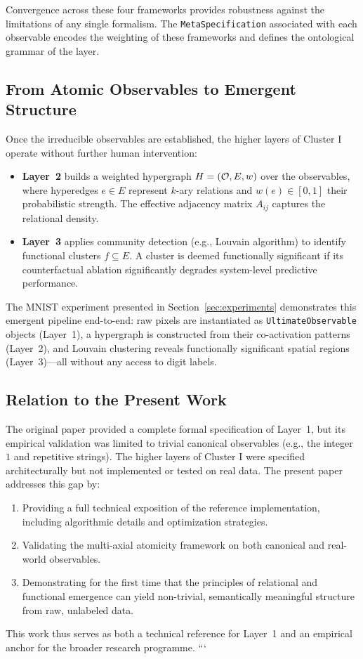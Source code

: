 Convergence across these four frameworks provides robustness against the limitations of any single formalism. The \texttt{MetaSpecification} associated with each observable encodes the weighting of these frameworks and defines the ontological grammar of the layer.

\subsection{From Atomic Observables to Emergent Structure}

Once the irreducible observables are established, the higher layers of Cluster I operate without further human intervention:

\begin{itemize}
    \item \textbf{Layer~2} builds a weighted hypergraph $H = (\mathcal{O}, E, w)$ over the observables, where hyperedges $e \in E$ represent $k$-ary relations and $w(e) \in [0,1]$ their probabilistic strength. The effective adjacency matrix $A_{ij}$ captures the relational density.
    \item \textbf{Layer~3} applies community detection (e.g., Louvain algorithm) to identify functional clusters $f \subseteq E$. A cluster is deemed functionally significant if its counterfactual ablation significantly degrades system-level predictive performance.
\end{itemize}

The MNIST experiment presented in Section~\ref{sec:experiments} demonstrates this emergent pipeline end-to-end: raw pixels are instantiated as \texttt{UltimateObservable} objects (Layer~1), a hypergraph is constructed from their co-activation patterns (Layer~2), and Louvain clustering reveals functionally significant spatial regions (Layer~3)---all without any access to digit labels.

\subsection{Relation to the Present Work}

The original \Apeiron{} paper \cite{beniers2026apeiron} provided a complete formal specification of Layer~1, but its empirical validation was limited to trivial canonical observables (e.g., the integer $1$ and repetitive strings). The higher layers of Cluster I were specified architecturally but not implemented or tested on real data. The present paper addresses this gap by:

\begin{enumerate}
    \item Providing a full technical exposition of the reference implementation, including algorithmic details and optimization strategies.
    \item Validating the multi-axial atomicity framework on both canonical and real-world observables.
    \item Demonstrating for the first time that the principles of relational and functional emergence can yield non-trivial, semantically meaningful structure from raw, unlabeled data.
\end{enumerate}

This work thus serves as both a technical reference for Layer~1 and an empirical anchor for the broader \Apeiron{} research programme.
```